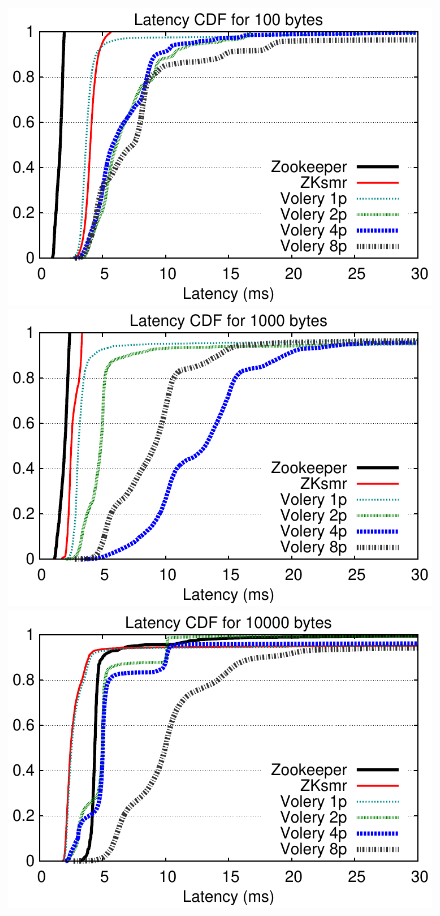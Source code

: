 \begin{figure}

\begin{minipage}[b]{0.3333\linewidth} %
\centering
      \includegraphics[width=0.9\columnwidth]{graphs/results/zk_mem/plot_latency_cdfs_100bytes}
\end{minipage}
\begin{minipage}[b]{0.3333\linewidth}
\centering
      \includegraphics[width=0.9\columnwidth]{graphs/results/zk_mem/plot_latency_cdfs_1000bytes}
\end{minipage}
\begin{minipage}[b]{0.3333\linewidth}
\centering
      \includegraphics[width=0.9\columnwidth]{graphs/results/zk_mem/plot_latency_cdfs_10000bytes}

\end{minipage}
\end{figure}
